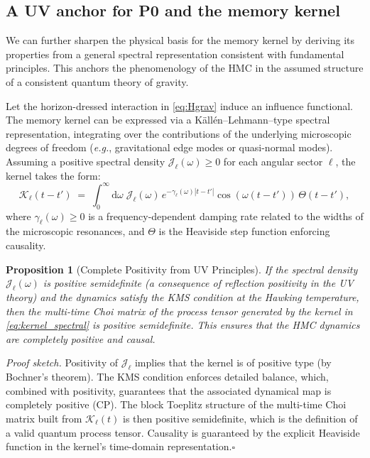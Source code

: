 \documentclass[11pt,a4paper]{article}
\providecommand{\texorpdfstring}[2]{#1}
\newcommand{\eg}{\textit{e.g.}\xspace}
\newcommand{\HMC}{\textsc{HMC}\xspace}
\theoremstyle{plain}
\newtheorem{proposition}[theorem]{Proposition}
\theoremstyle{definition}
\theoremstyle{remark}
\begin{document}
\subsection{A UV anchor for \texorpdfstring{P0}{P0} and the memory kernel}
\label{ssec:uv-anchor}
We can further sharpen the physical basis for the memory kernel by deriving its properties from a general spectral representation consistent with fundamental principles. This anchors the phenomenology of the \HMC{} in the assumed structure of a consistent quantum theory of gravity.

Let the horizon-dressed interaction in \eqref{eq:Hgrav} induce an influence functional. The memory kernel can be expressed via a K\"all\'en--Lehmann--type spectral representation, integrating over the contributions of the underlying microscopic degrees of freedom (\eg, gravitational edge modes or quasi-normal modes). Assuming a positive spectral density $\mathcal{J}_\ell(\omega)\ge 0$ for each angular sector $\ell$, the kernel takes the form:
\begin{equation}
\mathcal{K}_\ell(t-t')\;=\;\int_0^\infty\! \mathrm{d}\omega\; \mathcal{J}_\ell(\omega)\, e^{-\gamma_\ell(\omega) |t-t'|}\cos(\omega (t-t'))\,\Theta(t-t'),
\label{eq:kernel_spectral}
\end{equation}
where $\gamma_\ell(\omega)\ge 0$ is a frequency-dependent damping rate related to the widths of the microscopic resonances, and $\Theta$ is the Heaviside step function enforcing causality.

\begin{proposition}[Complete Positivity from UV Principles]
\label{prop:uv-kernel}
If the spectral density $\mathcal{J}_\ell(\omega)$ is positive semidefinite (a consequence of reflection positivity in the UV theory) and the dynamics satisfy the KMS condition at the Hawking temperature, then the multi-time Choi matrix of the process tensor generated by the kernel in \eqref{eq:kernel_spectral} is positive semidefinite. This ensures that the \HMC{} dynamics are completely positive and causal.
\end{proposition}

\textit{Proof sketch.} Positivity of $\mathcal{J}_\ell$ implies that the kernel is of positive type (by Bochner's theorem). The KMS condition enforces detailed balance, which, combined with positivity, guarantees that the associated dynamical map is completely positive (CP). The block Toeplitz structure of the multi-time Choi matrix built from $\mathcal{K}_\ell(t)$ is then positive semidefinite, which is the definition of a valid quantum process tensor. Causality is guaranteed by the explicit Heaviside function in the kernel's time-domain representation.\hfill$\square$
\end{document}
